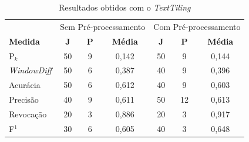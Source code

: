 \begin{table}[!h]
	\centering
	\begin{tabular}{|l||c|c|c||c|c|c|} \hline

		& \multicolumn{3}{c||}{Sem Pré-processamento} 
		& \multicolumn{3}{c|}{Com Pré-processamento}\\			

		\textbf{Medida} & 
		\textbf{J} &
		\textbf{P} & 
		\textbf{Média} &
		\textbf{J} &
		\textbf{P} & 
		\textbf{Média} \\	\hline

		P$_k$				& 50 & 9 & 0,142 & 50 & 9  & 0,144 \\ \hline
		\textit{WindowDiff}	& 50 & 6 & 0,387 & 40 & 9  & 0,396 \\ \hline
		Acurácia			& 50 & 6 & 0,612 & 40 & 9  & 0,603 \\ \hline
		Precisão			& 40 & 9 & 0,611 & 50 & 12 & 0,613 \\ \hline
		Revocação			& 20 & 3 & 0,886 & 20 & 3  & 0,917 \\ \hline
		F$^1$				& 30 & 6 & 0,605 & 40 & 3  & 0,648 \\ \hline

	\end{tabular}
	\caption{Resultados obtidos com o \textit{TextTiling}}
	\label{tab:resultadosTT}
\end{table}








